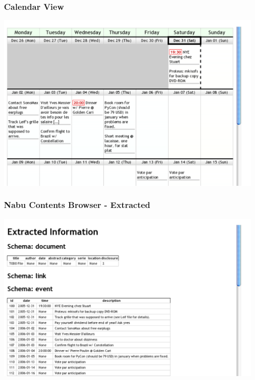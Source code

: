 \documentclass[compress,trans]{beamer}
\begin{document}
\begin{frame}[fragile]
  \frametitle{Calendar View}

\includegraphics[width=1.0\textwidth]{calendar-shot.pdf}


\end{frame}



\begin{frame}[fragile]
  \frametitle{Nabu Contents Browser - Extracted}

\includegraphics[width=1.0\textwidth]{ll-extracted.pdf}

\end{frame}
\end{document}
